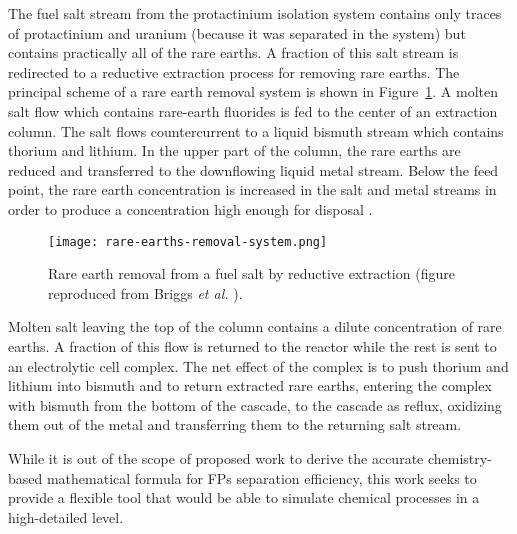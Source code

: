 The fuel salt stream from the protactinium isolation system contains only 
traces of protactinium and uranium (because it was separated in the system) 
but contains practically all of the rare earths. A fraction of this salt 
stream is redirected to a reductive extraction process for removing rare 
earths.  The principal scheme of a rare earth removal system is shown in 
Figure~\ref{fig:rare-earth-removal}. A molten salt flow which contains 
rare-earth fluorides is fed to the center of an extraction column. The salt 
flows countercurrent to a liquid bismuth stream which contains thorium and 
lithium. In the upper part of the column, the rare earths are reduced and 
transferred to the downflowing liquid metal stream. Below the feed point, the 
rare earth concentration is increased in the salt and metal streams in order 
to produce a concentration high enough for disposal 
\cite{briggs_molten-salt_1969}.
\begin{figure}[htbp!]
	\centering
	\texttt{[image: rare-earths-removal-system.png]}
	\caption{Rare earth removal from a fuel salt by reductive extraction 
	(figure reproduced from Briggs \emph{et al.} 
	\cite{briggs_molten-salt_1969}).}
	\label{fig:rare-earth-removal}
\end{figure}

Molten salt leaving the top of the column contains a dilute concentration of 
rare earths. A fraction of this flow is returned to the reactor while the 
rest is sent to an electrolytic cell complex. The net effect of the complex is 
to push thorium and lithium into bismuth and to return extracted rare earths, 
entering the complex with bismuth from the bottom of the cascade, to the 
cascade as reflux, oxidizing them out of the metal and transferring them to 
the returning salt stream.

While it is out of the scope of proposed work to derive the accurate 
chemistry-based mathematical formula for \glspl{FP} separation efficiency, 
this work seeks to provide a flexible tool that would be able to simulate 
chemical processes in a high-detailed level.

